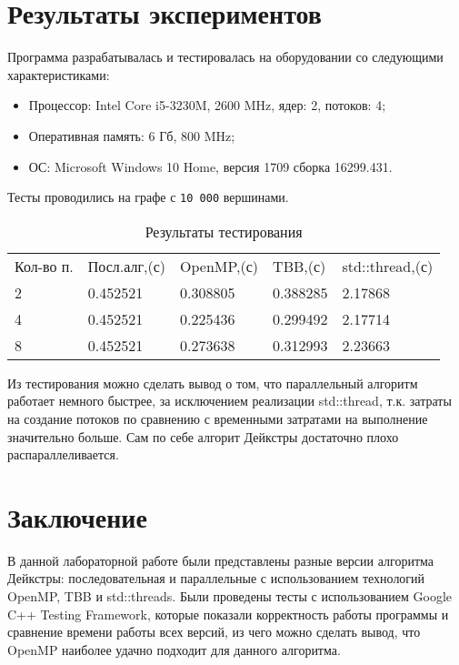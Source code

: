 \documentclass{report}
\begin{document}
\section*{Результаты экспериментов}
Программа разрабатывалась и тестировалась на оборудовании со следующими характеристиками:
\begin{itemize}
\item Процессор: Intel Core i5-3230M, 2600 MHz, ядер: 2, потоков: 4;
\item Оперативная память: 6 Гб, 800 MHz;
\item ОС: Microsoft Windows 10 Home, версия 1709 сборка 16299.431.
\end{itemize}

\par Тесты проводились на графе с \verb|10 000| вершинами.
\begin{table}[!h]
\centering
\begin{tabular}{lllll}
Кол-во п. & Посл.алг,(с) & OpenMP,(с) & TBB,(с) & std::thread,(с) \\
2 & 0.452521 & 0.308805 & 0.388285 &  2.17868\\
4 & 0.452521 & 0.225436 & 0.299492 &  2.17714\\
8 & 0.452521 & 0.273638 & 0.312993 &  2.23663
\end{tabular}
\caption{Результаты тестирования}
\end{table}

\par Из тестирования можно сделать вывод о том, что параллельный алгоритм работает немного быстрее, за исключением реализации std::thread, т.к. затраты на создание потоков по сравнению с временными затратами на выполнение значительно больше. Сам по себе алгорит Дейкстры достаточно плохо распараллеливается.

\newpage


\section*{Заключение}
В данной лабораторной работе были представлены разные версии алгоритма Дейкстры: последовательная и параллельные с использованием технологий OpenMP, TBB и std::threads. Были проведены тесты с использованием Google C++ Testing Framework, которые показали корректность работы программы и сравнение времени работы всех версий, из чего можно сделать вывод, что OpenMP наиболее удачно подходит для данного алгоритма.
\end{document}
